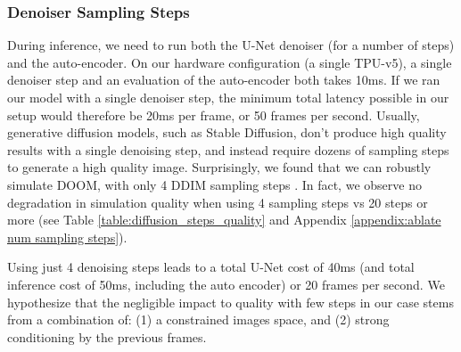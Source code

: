 \documentclass{article} %
\begin{document}
\subsubsection{Denoiser Sampling Steps}
During inference, we need to run both the U-Net denoiser (for a number of steps) and the auto-encoder.
On our hardware configuration (a single TPU-v5), a single denoiser step and an evaluation of the auto-encoder both takes 10ms.
If we ran our model with a single denoiser step, the minimum total latency possible in our setup would therefore be 20ms per frame, or 50 frames per second.
Usually, generative diffusion models, such as Stable Diffusion, don't produce high quality results with a single denoising step, and instead require dozens of sampling steps to generate a high quality image.
Surprisingly, we found that we can robustly simulate DOOM,
with only 4 DDIM sampling steps \citep{song2020denoising}.
In fact, we observe no degradation in simulation quality when using 4 sampling steps vs 20 steps or more (see Table \ref{table:diffusion_steps_quality} and Appendix \ref{appendix:ablate num sampling steps}).
\begin{table}[h]
\caption{\textbf{Generation with Varying Sampling Steps.} We evaluate the generation quality of a GameNGen model with an increasing number of steps using PSNR and LPIPS metrics. ``D'' marks a 1-step distilled model. See Appendix \ref{appendix:distillation} for more details.}
\label{table:diffusion_steps_quality}
\centering
\vspace{0.05in}
\end{table}
Using just 4 denoising steps leads to a total U-Net cost of 40ms (and total inference cost of 50ms, including the auto encoder) or 20 frames per second.
We hypothesize that the negligible impact to quality with few steps in our case stems from a combination of: (1) a constrained images space, and (2) strong conditioning by the previous frames.
\end{document}
